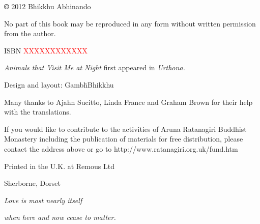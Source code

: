 \documentclass[a4paper]{article}
\begin{document}
\bigskip


\bigskip


\bigskip


\bigskip


\bigskip


\bigskip


\bigskip


\bigskip


\bigskip


\bigskip

\textbf{© }2012\textbf{ }Bhikkhu Abhinando 


\bigskip

No part of this book may be reproduced in any form without written permission from the author.


\bigskip

ISBN \textcolor{red}{XXXXXXXXXXXX}


\bigskip

\textit{Animals that Visit Me at Night} first appeared in \textit{Urthona.}


\bigskip


\bigskip


\bigskip

Design and layout: Gambh\=\iro Bhikkhu


\bigskip

Many thanks to Ajahn Sucitto, Linda France and Graham Brown for their help with the translations.


\bigskip


\bigskip

If you would like to contribute to the activities of Aruna Ratanagiri Buddhist Monastery including the publication of
materials for free distribution, please contact the address above or go to http://www.ratanagiri.org.uk/fund.htm


\bigskip


\bigskip

Printed in the U.K. at Remous Ltd

Sherborne, Dorset

\clearpage
\bigskip


\bigskip


\bigskip


\bigskip


\bigskip


\bigskip


\bigskip

{\itshape
Love is most nearly itself}

{\itshape
when here and now cease to matter.}
\end{document}
